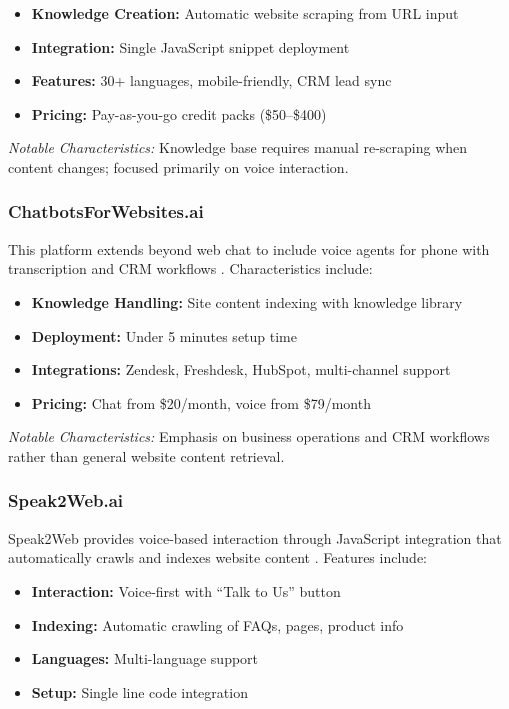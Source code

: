 \begin{itemize}[leftmargin=*]
    \item \textbf{Knowledge Creation:} Automatic website scraping from URL input
    \item \textbf{Integration:} Single JavaScript snippet deployment
    \item \textbf{Features:} 30+ languages, mobile-friendly, CRM lead sync
    \item \textbf{Pricing:} Pay-as-you-go credit packs (\$50--\$400)
\end{itemize}

\textit{Notable Characteristics:} Knowledge base requires manual re-scraping when content changes; focused primarily on voice interaction.

\subsubsection{ChatbotsForWebsites.ai}

This platform extends beyond web chat to include voice agents for phone with transcription and CRM workflows \cite{chatbotsforwebsites}. Characteristics include:

\begin{itemize}[leftmargin=*]
    \item \textbf{Knowledge Handling:} Site content indexing with knowledge library
    \item \textbf{Deployment:} Under 5 minutes setup time
    \item \textbf{Integrations:} Zendesk, Freshdesk, HubSpot, multi-channel support
    \item \textbf{Pricing:} Chat from \$20/month, voice from \$79/month
\end{itemize}

\textit{Notable Characteristics:} Emphasis on business operations and CRM workflows rather than general website content retrieval.

\subsubsection{Speak2Web.ai}

Speak2Web provides voice-based interaction through JavaScript integration that automatically crawls and indexes website content \cite{speak2web}. Features include:

\begin{itemize}[leftmargin=*]
    \item \textbf{Interaction:} Voice-first with ``Talk to Us'' button
    \item \textbf{Indexing:} Automatic crawling of FAQs, pages, product info
    \item \textbf{Languages:} Multi-language support
    \item \textbf{Setup:} Single line code integration
\end{itemize}

